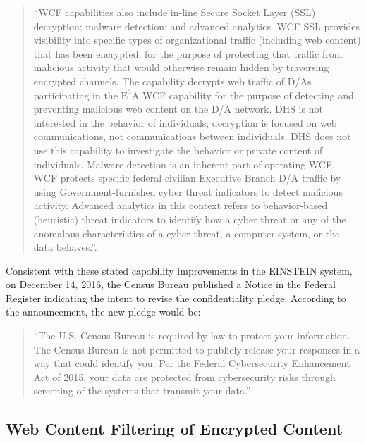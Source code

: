 \documentclass[fleqn,10pt]{wlscirep}
\newcommand{\ETA}{$\textrm{E}^\textrm{3}\textrm{A}$\xspace}
\begin{document}
\begin{quote}
``WCF capabilities also include in-line Secure Socket Layer (SSL)
decryption; malware detection; and advanced analytics. WCF SSL
provides visibility into specific types of organizational traffic
(including web content) that has been encrypted, for the purpose of
protecting that traffic from malicious activity that would otherwise
remain hidden by traversing encrypted channels. The capability
decrypts web traffic of D/As participating in the \ETA WCF capability
for the purpose of detecting and preventing malicious web content on
the D/A network.  DHS is not interested in the behavior of
individuals; decryption is focused on web communications, not
communications between individuals. DHS does not use this capability
to investigate the behavior or private content of individuals. Malware
detection is an inherent part of operating WCF. WCF protects specific
federal civilian Executive Branch D/A traffic by using
Government-furnished cyber threat indicators to detect malicious
activity. Advanced analytics in this context refers to behavior-based
(heuristic) threat indicators to identify how a cyber threat or any of
the anomalous characteristics of a cyber threat, a computer system, or
the data behaves.''\cite[p.3]{dhs-e3a-pia2}.
\end{quote}

Consistent with these stated capability improvements in the EINSTEIN
system, on December 14, 2016, the Census Bureau published a Notice in
the Federal Register indicating the intent to revise the
confidentiality pledge.\cite{federal-register-2016-12-14} According to
the announcement, the new pledge would be:

\begin{quote}
  ``The U.S. Census Bureau is required by law to protect your
  information. The Census Bureau is not permitted to publicly release
  your responses in a way that could identify you. Per the Federal
  Cybersecurity Enhancement Act of 2015, your data are protected from
  cybersecurity risks through screening of the systems that transmit
  your data.''\cite{federal-register-2016-12-14}
\end{quote}

\subsection{Web Content Filtering of Encrypted Content}
\end{document}
